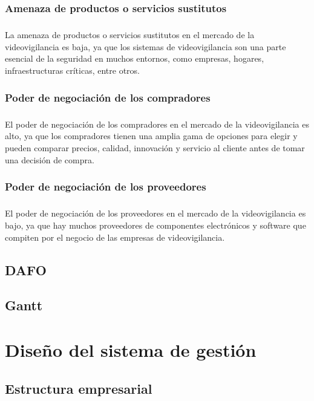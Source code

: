 \documentclass{report}
\begin{document}
        \subsection*{Amenaza de productos o servicios sustitutos}
          \paragraph*{}{La amenaza de productos o servicios sustitutos en el mercado de la videovigilancia es baja, ya que los sistemas de videovigilancia son una parte esencial de la seguridad en muchos entornos, como empresas, hogares, infraestructuras críticas, entre otros.}
        \subsection*{Poder de negociación de los compradores}
          \paragraph*{}{El poder de negociación de los compradores en el mercado de la videovigilancia es alto, ya que los compradores tienen una amplia gama de opciones para elegir y pueden comparar precios, calidad, innovación y servicio al cliente antes de tomar una decisión de compra.}
        \subsection*{Poder de negociación de los proveedores}
          \paragraph*{}{El poder de negociación de los proveedores en el mercado de la videovigilancia es bajo, ya que hay muchos proveedores de componentes electrónicos y software que compiten por el negocio de las empresas de videovigilancia.}
      \section{DAFO}
      \section{Gantt}
    \chapter{Diseño del sistema de gestión}
        \section{Estructura empresarial}
\end{document}
